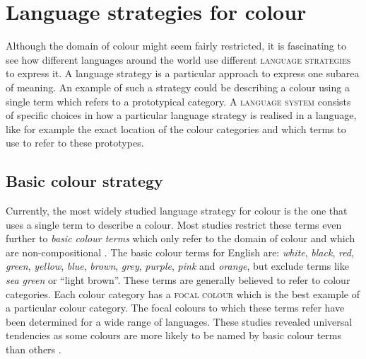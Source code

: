 \section{Language strategies for colour}
\label{s:strats-for-colour}

Although the domain of colour might seem fairly restricted, it is
fascinating to see how different languages around the world use
different \textsc{language strategies} to
express it. A language strategy is a particular approach to express
one subarea of meaning. An example of such a strategy could be
describing a colour using a single term which refers to a prototypical
category. A \textsc{language system} consists of
specific choices in how a particular language strategy is realised in
a language, like for example the exact location of the colour
categories and which terms to use to refer to these prototypes.

\subsection{Basic colour strategy}
\label{s:intro-basic-colour-strategy}

Currently, the most widely studied language strategy for colour is the
one that uses a single term to describe a colour. Most studies
restrict these terms even further to \emph{basic colour
  terms} which only refer to the domain of
colour and which are non-compositional \citep{berlin69basic}. The
basic colour terms for English are: \textit{white}, \textit{black}, \textit{red},
\textit{green}, \textit{yellow}, \textit{blue}, \textit{brown}, \textit{grey}, \textit{purple},
\textit{pink} and \textit{orange}, but exclude terms like \textit{sea green} or
``light brown''. These terms are generally believed to refer to colour
categories. Each colour category has a \textsc{focal colour} which is the best example of a particular colour
category. The focal colours to which these terms refer have been
determined for a wide range of languages. These studies revealed
universal tendencies as some colours are more likely to be named by
basic colour terms than others \citep{regier05focal}.

